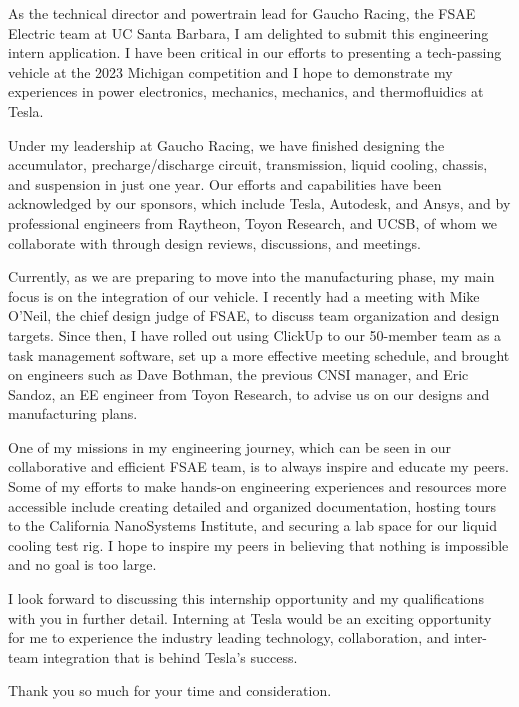 \documentclass[11pt, letterpaper]{awesome-cv} %
\begin{document}
\makecvheader %

\makelettertitle %


\begin{cvletter}

As the technical director and powertrain lead for Gaucho Racing, the FSAE Electric team at UC Santa Barbara, I am delighted to submit this engineering intern application. I have been critical in our efforts to presenting a tech-passing vehicle at the 2023 Michigan competition and I hope to demonstrate my experiences in power electronics, mechanics, mechanics, and thermofluidics at Tesla. 

Under my leadership at Gaucho Racing, we have finished designing the accumulator, precharge/discharge circuit, transmission, liquid cooling, chassis, and suspension in just one year. Our efforts and capabilities have been acknowledged by our sponsors, which include Tesla, Autodesk, and Ansys, and by professional engineers from Raytheon, Toyon Research, and UCSB, of whom we collaborate with through design reviews, discussions, and meetings. 

Currently, as we are preparing to move into the manufacturing phase, my main focus is on the integration of our vehicle. I recently had a meeting with Mike O'Neil, the chief design judge of FSAE, to discuss team organization and design targets. Since then, I have rolled out using ClickUp to our 50-member team as a task management software, set up a more effective meeting schedule, and brought on engineers such as Dave Bothman, the previous CNSI manager, and Eric Sandoz, an EE engineer from Toyon Research, to advise us on our designs and manufacturing plans.

One of my missions in my engineering journey, which can be seen in our collaborative and efficient FSAE team, is to always inspire and educate my peers. Some of my efforts to make hands-on engineering experiences and resources more accessible include creating detailed and organized documentation, hosting tours to the California NanoSystems Institute, and securing a lab space for our liquid cooling test rig. I hope to inspire my peers in believing that nothing is impossible and no goal is too large.

I look forward to discussing this internship opportunity and my qualifications with you in further detail. Interning at Tesla would be an exciting opportunity for me to experience the industry leading technology, collaboration, and inter-team integration that is behind Tesla's success. 

Thank you so much for your time and consideration.



\end{cvletter}


\makeletterclosing %
\end{document}
